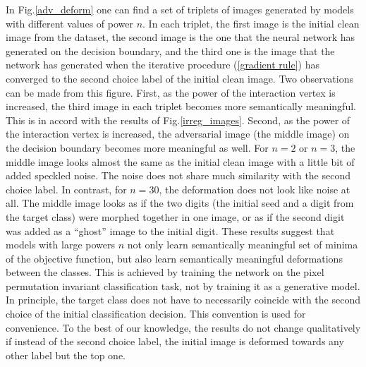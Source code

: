 \documentclass[12pt]{article} %
\begin{document}
In Fig.\ref{adv_deform} one can find a set of triplets of images generated by models with different values of power $n$. In each triplet, the first image is the initial clean image from the dataset, the second image is the one that the neural network has generated on the decision boundary, and the third one is the image that the network has generated when the iterative procedure (\ref{gradient rule}) has converged to the second choice label of the initial clean image. Two observations can be made from this figure. First, as the power of the interaction vertex is increased, the third image in each triplet becomes more semantically meaningful. This is in accord with the results of Fig.\ref{irreg_images}. Second, as the power of the interaction vertex is increased, the adversarial image (the middle image) on the decision boundary becomes more meaningful as well. For $n=2$ or $n=3$, the middle image looks almost the same as the initial clean image with a little bit of added speckled noise. The noise does not share much similarity with the second choice label. In contrast, for $n=30$, the deformation does not look like noise at all. The middle image looks as if the two digits (the initial seed and a digit from the target class) were morphed together in one image, or as if the second digit was added as a ``ghost'' image to the initial digit. These results suggest that models with large powers $n$ not only learn semantically meaningful set of minima of the objective function, but also learn semantically meaningful deformations between the classes. This is achieved by training the network on the pixel permutation invariant classification task, not by training it as a generative model. In principle, the target class does not have to necessarily coincide with the second choice of the initial classification decision. This convention is used for convenience. To the best of our knowledge, the results do not change qualitatively if instead of the second choice label, the initial image is deformed towards any other label but the top one.

\vspace{0.8cm}
\end{document}
